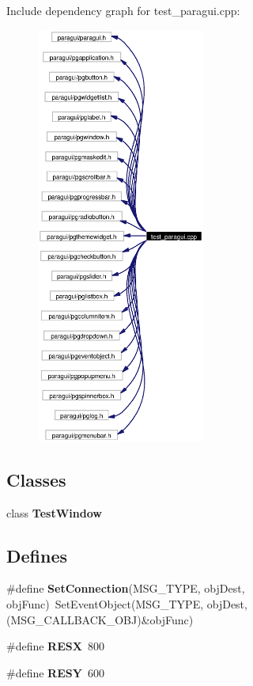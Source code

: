 Include dependency graph for test\_\-paragui.cpp:\begin{figure}[H]
\begin{center}
\leavevmode
\includegraphics[width=157pt]{test__paragui_8cpp__incl}
\end{center}
\end{figure}
\subsection*{Classes}
\begin{CompactItemize}
\item 
class {\bf Test\-Window}
\end{CompactItemize}
\subsection*{Defines}
\begin{CompactItemize}
\item 
\#define {\bf Set\-Connection}(MSG\_\-TYPE, obj\-Dest, obj\-Func)\ Set\-Event\-Object(MSG\_\-TYPE, obj\-Dest, (MSG\_\-CALLBACK\_\-OBJ)\&obj\-Func)
\item 
\#define {\bf RESX}\ 800
\item 
\#define {\bf RESY}\ 600
\end{CompactItemize}
